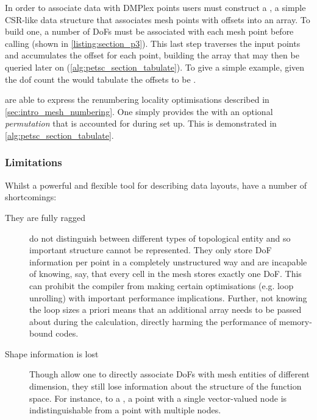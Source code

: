 \documentclass[thesis]{subfiles}
\begin{document}
In order to associate data with DMPlex points users must construct a , a simple CSR-like data structure that associates mesh points with offsets into an array.
To build one, a number of DoFs must be associated with each mesh point before calling  (shown in \cref{listing:section_p3}).
This last step traverses the input points and accumulates the offset for each point, building the array that may then be queried later on (\cref{alg:petsc_section_tabulate}).
To give a simple example, given the \gls{dof} count \ccode{[1, 0, 3, 2, 0, 1]} the  would tabulate the offsets to be \ccode{[0, 1, 1, 4, 6, 6]}.

 are able to express the renumbering locality optimisations described in \cref{sec:intro_mesh_numbering}.
One simply provides the  with an optional \emph{permutation} that is accounted for during set up.
This is demonstrated in \cref{alg:petsc_section_tabulate}.

\subsubsection{Limitations}

Whilst a powerful and flexible tool for describing data layouts,  have a number of shortcomings:

\begin{description}
  \item[They are fully ragged]
     do not distinguish between different types of topological entity and so important structure cannot be represented.
    They only store DoF information per point in a completely unstructured way and are incapable of knowing, say, that every cell in the mesh stores exactly one DoF.
    This can prohibit the compiler from making certain optimisations (e.g. loop unrolling) with important performance implications.
    Further, not knowing the loop sizes a priori means that an additional array needs to be passed about during the calculation, directly harming the performance of memory-bound codes.

  \item[Shape information is lost]
    Though  allow one to directly associate DoFs with mesh entities of different dimension, they still lose information about the structure of the function space.
    For instance, to a , a point with a single vector-valued node is indistinguishable from a point with multiple nodes.
\end{description}
\end{document}
